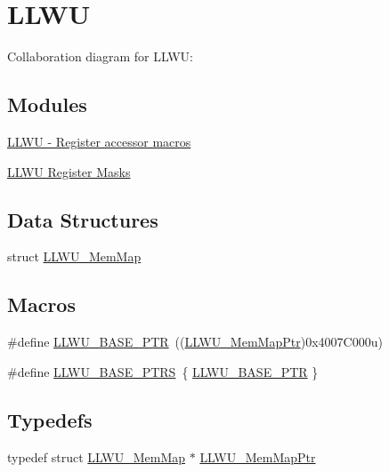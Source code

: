 \hypertarget{group___l_l_w_u___peripheral}{}\section{L\+L\+WU}
\label{group___l_l_w_u___peripheral}
Collaboration diagram for L\+L\+WU\+:
\subsection*{Modules}
\begin{DoxyCompactItemize}
\item 
\hyperlink{group___l_l_w_u___register___accessor___macros}{L\+L\+W\+U -\/ Register accessor macros}
\item 
\hyperlink{group___l_l_w_u___register___masks}{L\+L\+W\+U Register Masks}
\end{DoxyCompactItemize}
\subsection*{Data Structures}
\begin{DoxyCompactItemize}
\item 
struct \hyperlink{struct_l_l_w_u___mem_map}{L\+L\+W\+U\+\_\+\+Mem\+Map}
\end{DoxyCompactItemize}
\subsection*{Macros}
\begin{DoxyCompactItemize}
\item 
\#define \hyperlink{group___l_l_w_u___peripheral_ga89c97b9e8756088cb3d8617c022ae6ac}{L\+L\+W\+U\+\_\+\+B\+A\+S\+E\+\_\+\+P\+TR}~((\hyperlink{group___l_l_w_u___peripheral_ga03cfefad45ecbfeb2cd16eb85ccfe186}{L\+L\+W\+U\+\_\+\+Mem\+Map\+Ptr})0x4007\+C000u)
\item 
\#define \hyperlink{group___l_l_w_u___peripheral_ga4826d688973513cc02a2f1d4f67c336b}{L\+L\+W\+U\+\_\+\+B\+A\+S\+E\+\_\+\+P\+T\+RS}~\{ \hyperlink{group___l_l_w_u___peripheral_ga89c97b9e8756088cb3d8617c022ae6ac}{L\+L\+W\+U\+\_\+\+B\+A\+S\+E\+\_\+\+P\+TR} \}
\end{DoxyCompactItemize}
\subsection*{Typedefs}
\begin{DoxyCompactItemize}
\item 
typedef struct \hyperlink{struct_l_l_w_u___mem_map}{L\+L\+W\+U\+\_\+\+Mem\+Map} $\ast$ \hyperlink{group___l_l_w_u___peripheral_ga03cfefad45ecbfeb2cd16eb85ccfe186}{L\+L\+W\+U\+\_\+\+Mem\+Map\+Ptr}
\end{DoxyCompactItemize}


